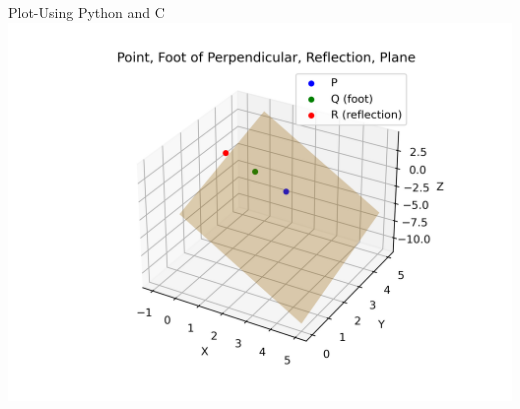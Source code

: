 \documentclass{beamer}
\begin{document}
\begin{frame}{Plot-Using  Python and C}
    \centering
    \includegraphics[width=\columnwidth, height=0.8\textheight, keepaspectratio]{../figs/point_plane_plot.png}     
\end{frame}

	
\end{document}
